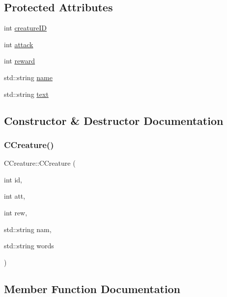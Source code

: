\subsection*{Protected Attributes}
\begin{DoxyCompactItemize}
\item 
int \mbox{\hyperlink{class_c_creature_a20f14129e1b97fddc80536e74104d3e8}{creature\+ID}}
\item 
int \mbox{\hyperlink{class_c_creature_a1390ddb23849de09d8ad815adeb3bd8f}{attack}}
\item 
int \mbox{\hyperlink{class_c_creature_a84d12f187964e5c42456cf524e120200}{reward}}
\item 
std\+::string \mbox{\hyperlink{class_c_creature_a4c3363eef23914e4ef64563e3d741354}{name}}
\item 
std\+::string \mbox{\hyperlink{class_c_creature_a81120b10087b2f0cbd11ce2b3eb85e23}{text}}
\end{DoxyCompactItemize}


\subsection{Constructor \& Destructor Documentation}
\mbox{\label{class_c_creature_a4ea5c6009c88ef683e3c4dd64cc1f888}} 
\subsubsection{\texorpdfstring{C\+Creature()}{CCreature()}}
{\footnotesize\ttfamily C\+Creature\+::\+C\+Creature (\begin{DoxyParamCaption}\item[{int}]{id,  }\item[{int}]{att,  }\item[{int}]{rew,  }\item[{std\+::string}]{nam,  }\item[{std\+::string}]{words }\end{DoxyParamCaption})\hspace{0.3cm}{\ttfamily [inline]}}



\subsection{Member Function Documentation}
\mbox{\label{class_c_creature_ab586f3c2dd37addfa8281fd4d24c7b54}} 
